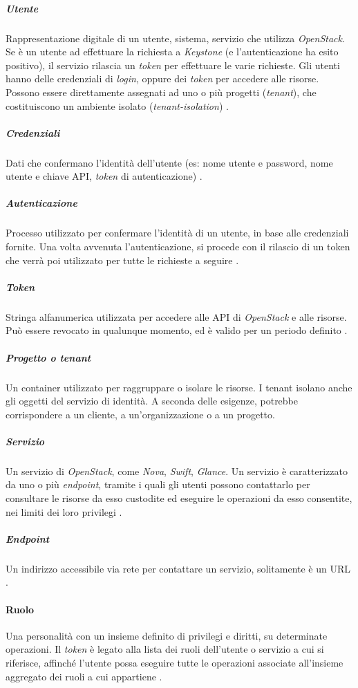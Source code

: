 \documentclass[../main.tex]{subfiles}
\begin{document}
\subparagraph{Utente}
Rappresentazione digitale di un utente, sistema, servizio che utilizza \textit{OpenStack}.
Se è un utente ad effettuare la richiesta a \textit{Keystone} (e l'autenticazione ha esito positivo), il servizio rilascia un \textit{token} per effettuare le varie richieste.
Gli utenti hanno delle credenziali di \textit{login}, oppure dei \textit{token} per accedere alle risorse.
Possono essere direttamente assegnati ad uno o più progetti (\textit{tenant}), che costituiscono un ambiente isolato (\textit{tenant-isolation}) \cite{KeystoneConcepts}.
\subparagraph{Credenziali}
Dati che confermano l'identità dell'utente (es: nome utente e password, nome utente e chiave API, \textit{token} di autenticazione) \cite{KeystoneConcepts}.
\subparagraph{Autenticazione}
Processo utilizzato per confermare l'identità di un utente, in base alle credenziali fornite.
Una volta avvenuta l'autenticazione, si procede con il rilascio di un token che verrà poi utilizzato per tutte le richieste a seguire \cite{KeystoneConcepts}.
\subparagraph{\textit{Token}}
Stringa alfanumerica utilizzata per accedere alle API di \textit{OpenStack} e alle risorse. Può essere revocato in qualunque momento, ed è valido per un periodo definito \cite{KeystoneConcepts}.
\subparagraph{Progetto o tenant}
Un container utilizzato per raggruppare o isolare le risorse. I tenant isolano anche gli oggetti del servizio di identità.
A seconda delle esigenze, potrebbe corrispondere a un cliente, a un'organizzazione o a un progetto.
\subparagraph{Servizio}
Un servizio di \textit{OpenStack}, come \textit{Nova}, \textit{Swift}, \textit{Glance}. Un servizio è caratterizzato da uno o più \textit{endpoint}, tramite i quali gli utenti possono contattarlo per consultare le risorse da esso custodite ed eseguire le operazioni da esso consentite, nei limiti dei loro privilegi \cite{KeystoneConcepts}.
\subparagraph{\textit{Endpoint}}
Un indirizzo accessibile via rete per contattare un servizio, solitamente è un URL \cite{KeystoneConcepts}.
\paragraph{Ruolo}
Una personalità con un insieme definito di privilegi e diritti, su determinate operazioni.
Il \textit{token} è legato alla lista dei ruoli dell'utente o servizio a cui si riferisce, affinché l'utente possa eseguire tutte le operazioni associate all'insieme aggregato dei ruoli a cui appartiene \cite{KeystoneConcepts}.
\end{document}
